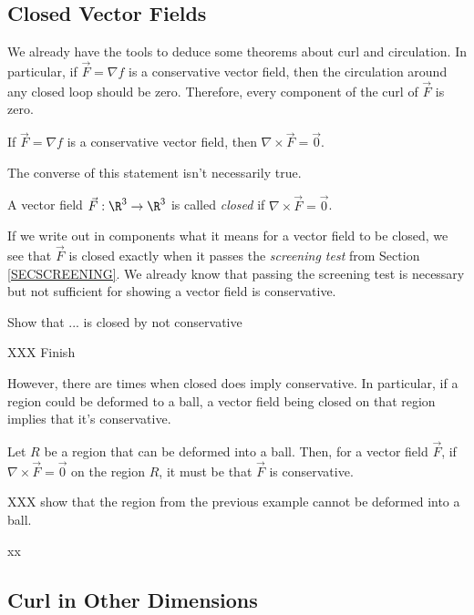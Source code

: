 \subsection{Closed Vector Fields}
We already have the tools to deduce some theorems about curl and circulation.
In particular, if $\vec F=\nabla f$ is a conservative vector field, then the circulation
around any closed loop should be zero.  Therefore, every component of the curl of
$\vec F$ is zero.

\begin{theorem}
	If $\vec F=\nabla f$ is a conservative vector field, then $\nabla \times \vec F=\vec 0$.
\end{theorem}

The converse of this statement isn't necessarily true.

\begin{definition}
	A vector field $\vec F:\R^3\to\R^3$ is called \emph{closed}
	if $\nabla \times \vec F=\vec 0$.
\end{definition}

If we write out in components what it means for a vector field to be closed,
we see that $\vec F$ is closed exactly when it passes the \emph{screening test}
from Section \ref{SECSCREENING}.  We already know that passing the screening test
is necessary but not sufficient for showing a vector field is conservative.

\begin{example}
	Show that ... is closed by not conservative

	XXX Finish
\end{example}

However, there are times when closed does imply conservative.  In particular,
if a region could be deformed to a ball, a vector field
being closed on that region implies that it's conservative.

\begin{theorem}
	Let $R$ be a region that can be deformed into
	a ball.  Then, for a vector field $\vec F$,
	if $\nabla\times \vec F=\vec 0$ on the region $R$,
	it must be that $\vec F$ is conservative.
\end{theorem}

\begin{example}
	XXX show that the region from the previous example cannot
	be deformed into a ball.
\end{example}
xx

\subsection{Curl in Other Dimensions}

